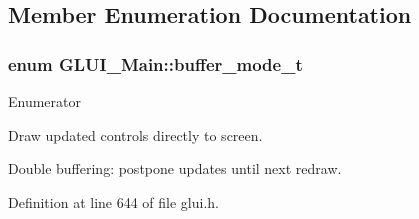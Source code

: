 \subsection{Member Enumeration Documentation}
\hypertarget{class_g_l_u_i___main_a0024f5e2750f6fe9e428ff885cf6d62e}{
\subsubsection[{buffer\+\_\+mode\+\_\+t}]{\setlength{\rightskip}{0pt plus 5cm}enum {\bf G\+L\+U\+I\+\_\+\+Main\+::buffer\+\_\+mode\+\_\+t}\hspace{0.3cm}{\ttfamily [protected]}}}\label{class_g_l_u_i___main_a0024f5e2750f6fe9e428ff885cf6d62e}
\begin{Desc}
\item[Enumerator]\par
\begin{description}
\item[{\em 
\hypertarget{class_g_l_u_i___main_a0024f5e2750f6fe9e428ff885cf6d62ea96e503bd03e3d418f350f3a854d0292d}{buffer\+\_\+front}\label{class_g_l_u_i___main_a0024f5e2750f6fe9e428ff885cf6d62ea96e503bd03e3d418f350f3a854d0292d}
}]Draw updated controls directly to screen. \item[{\em 
\hypertarget{class_g_l_u_i___main_a0024f5e2750f6fe9e428ff885cf6d62ea839b43cd2decf85c6bdcf738d92e122c}{buffer\+\_\+back}\label{class_g_l_u_i___main_a0024f5e2750f6fe9e428ff885cf6d62ea839b43cd2decf85c6bdcf738d92e122c}
}]Double buffering\+: postpone updates until next redraw. \end{description}
\end{Desc}


Definition at line 644 of file glui.\+h.



